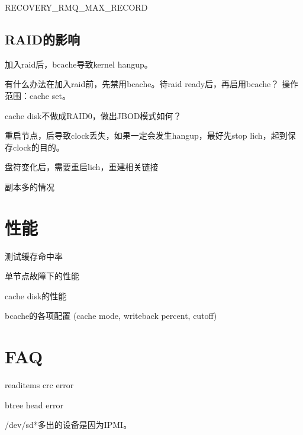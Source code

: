 RECOVERY\_RMQ\_MAX\_RECORD

\subsection{RAID的影响}


加入raid后，bcache导致kernel hangup。

有什么办法在加入raid前，先禁用bcache。待raid ready后，再启用bcache？
操作范围：cache set。

cache disk不做成RAID0，做出JBOD模式如何？

重启节点，后导致clock丢失，如果一定会发生hangup，最好先stop lich，起到保存clock的目的。

盘符变化后，需要重启lich，重建相关链接

副本多的情况

\section{性能}

测试缓存命中率

单节点故障下的性能
\begin{enumbox}
\item cache disk的性能
\item bcache的各项配置 (cache mode, writeback percent, cutoff)
\end{enumbox}

\section{FAQ}

readitems crc error

btree head error

/dev/sd*多出的设备是因为IPMI。
